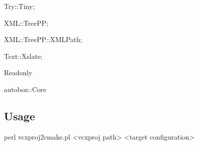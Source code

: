 
\begin{DoxyItemize}
\item Try\+::\+Tiny;
\item X\+M\+L\+::\+Tree\+PP;
\item X\+M\+L\+::\+Tree\+P\+P\+::\+X\+M\+L\+Path;
\item Text\+::\+Xslate;
\item Readonly
\item autobox\+::\+Core
\end{DoxyItemize}

\subsection*{Usage}

\begin{DoxyVerb}perl vcxproj2cmake.pl <vcxproj path> <target configuration>\end{DoxyVerb}
 